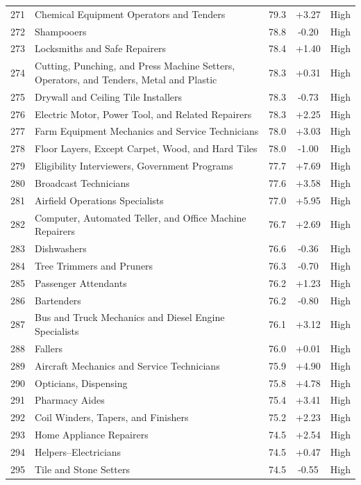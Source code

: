{\begin{longtable}{rp{7cm}ccc}
271 & Chemical Equipment Operators and Tenders & 79.3 & +3.27 & High \\
272 & Shampooers & 78.8 & -0.20 & High \\
273 & Locksmiths and Safe Repairers & 78.4 & +1.40 & High \\
274 & Cutting, Punching, and Press Machine Setters, Operators, and Tenders, Metal and Plastic & 78.3 & +0.31 & High \\
275 & Drywall and Ceiling Tile Installers & 78.3 & -0.73 & High \\
276 & Electric Motor, Power Tool, and Related Repairers & 78.3 & +2.25 & High \\
277 & Farm Equipment Mechanics and Service Technicians & 78.0 & +3.03 & High \\
278 & Floor Layers, Except Carpet, Wood, and Hard Tiles & 78.0 & -1.00 & High \\
279 & Eligibility Interviewers, Government Programs & 77.7 & +7.69 & High \\
280 & Broadcast Technicians & 77.6 & +3.58 & High \\
281 & Airfield Operations Specialists & 77.0 & +5.95 & High \\
282 & Computer, Automated Teller, and Office Machine Repairers & 76.7 & +2.69 & High \\
283 & Dishwashers & 76.6 & -0.36 & High \\
284 & Tree Trimmers and Pruners & 76.3 & -0.70 & High \\
285 & Passenger Attendants & 76.2 & +1.23 & High \\
286 & Bartenders & 76.2 & -0.80 & High \\
287 & Bus and Truck Mechanics and Diesel Engine Specialists & 76.1 & +3.12 & High \\
288 & Fallers & 76.0 & +0.01 & High \\
289 & Aircraft Mechanics and Service Technicians & 75.9 & +4.90 & High \\
290 & Opticians, Dispensing & 75.8 & +4.78 & High \\
291 & Pharmacy Aides & 75.4 & +3.41 & High \\
292 & Coil Winders, Tapers, and Finishers & 75.2 & +2.23 & High \\
293 & Home Appliance Repairers & 74.5 & +2.54 & High \\
294 & Helpers--Electricians & 74.5 & +0.47 & High \\
295 & Tile and Stone Setters & 74.5 & -0.55 & High \\

\end{longtable}}
